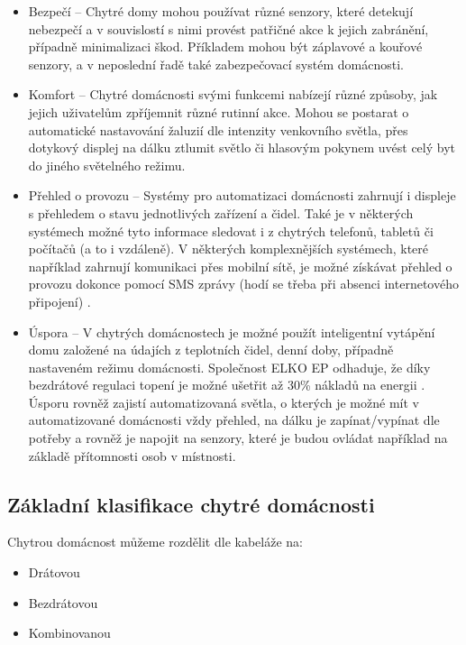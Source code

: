 \begin{itemize}
\item Bezpečí – Chytré domy mohou používat různé senzory, které detekují nebezpečí a v souvislostí s nimi provést patřičné akce k jejich zabránění, případně minimalizaci škod. Příkladem mohou být záplavové a kouřové senzory, a v neposlední řadě také zabezpečovací systém domácnosti.
\item Komfort – Chytré domácnosti svými funkcemi nabízejí různé způsoby, jak jejich uživatelům zpříjemnit různé rutinní akce. Mohou se postarat o automatické nastavování žaluzií dle intenzity venkovního světla, přes dotykový displej na dálku ztlumit světlo či hlasovým pokynem uvést celý byt do jiného světelného režimu. 
\item Přehled o provozu – Systémy pro automatizaci domácnosti zahrnují i displeje s přehledem o stavu jednotlivých zařízení a čidel. Také je v některých systémech možné tyto informace sledovat i z chytrých telefonů, tabletů či počítačů (a to i vzdáleně). V některých komplexnějších systémech, které například zahrnují komunikaci přes mobilní sítě, je možné získávat přehled o provozu dokonce pomocí SMS zprávy (hodí se třeba při absenci internetového připojení) \cite{CoJeSmartHome}.
\item Úspora – V chytrých domácnostech je možné použít inteligentní vytápění domu založené na údajích z teplotních čidel, denní doby, případně nastaveném režimu domácnosti. Společnost ELKO EP odhaduje, že díky bezdrátové regulaci topení je možné ušetřit až 30\% nákladů na energii \cite{TopteSRozumem}. Úsporu rovněž zajistí automatizovaná světla, o kterých je možné mít v automatizované domácnosti vždy přehled, na dálku je zapínat/vypínat dle potřeby a rovněž je napojit na senzory, které je budou ovládat například na základě přítomnosti osob v místnosti.
\end{itemize}
    

\subsection*{Základní klasifikace chytré domácnosti}
Chytrou domácnost můžeme rozdělit dle kabeláže na:

\begin{itemize}
    \item Drátovou
    \item Bezdrátovou 
    \item Kombinovanou
\end{itemize}

